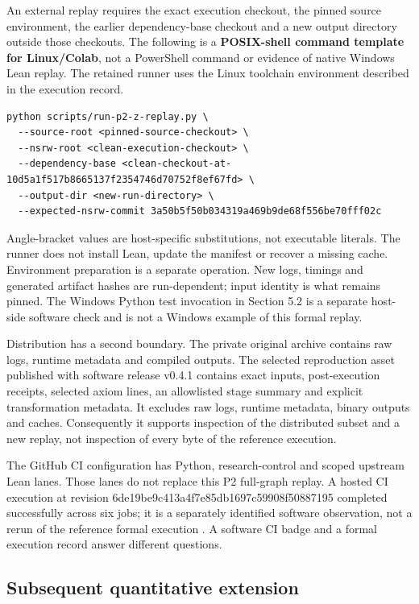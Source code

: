 \documentclass[11pt,a4paper]{article}
\begin{document}
An external replay requires the exact execution checkout, the pinned source environment, the earlier dependency-base checkout and a new output directory outside those checkouts. The following is a \textbf{POSIX-shell command template for Linux/Colab}, not a PowerShell command or evidence of native Windows Lean replay. The retained runner uses the Linux toolchain environment described in the execution record.

\begin{lstlisting}
python scripts/run-p2-z-replay.py \
  --source-root <pinned-source-checkout> \
  --nsrw-root <clean-execution-checkout> \
  --dependency-base <clean-checkout-at-10d5a1f517b8665137f2354746d70752f8ef67fd> \
  --output-dir <new-run-directory> \
  --expected-nsrw-commit 3a50b5f50b034319a469b9de68f556be70fff02c
\end{lstlisting}

Angle-bracket values are host-specific substitutions, not executable literals. The runner does not install Lean, update the manifest or recover a missing cache. Environment preparation is a separate operation. New logs, timings and generated artifact hashes are run-dependent; input identity is what remains pinned. The Windows Python test invocation in Section 5.2 is a separate host-side software check and is not a Windows example of this formal replay.

Distribution has a second boundary. The private original archive contains raw logs, runtime metadata and compiled outputs. The selected reproduction asset published with software release v0.4.1 contains exact inputs, post-execution receipts, selected axiom lines, an allowlisted stage summary and explicit transformation metadata. It excludes raw logs, runtime metadata, binary outputs and caches. Consequently it supports inspection of the distributed subset and a new replay, not inspection of every byte of the reference execution.

The GitHub CI configuration has Python, research-control and scoped upstream Lean lanes. Those lanes do not replace this P2 full-graph replay. A hosted CI execution at revision 6de19be9c413a4f7e85db1697c59908f50887195 completed successfully across six jobs; it is a separately identified software observation, not a rerun of the reference formal execution \cite{ref11}. A software CI badge and a formal execution record answer different questions.

\subsection{Subsequent quantitative extension}
\end{document}
